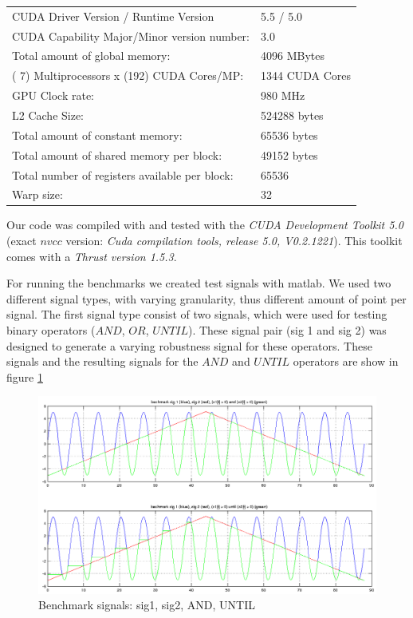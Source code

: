 \documentclass[a4paper,10pt]{article}
\begin{document}
\begin{center}
	\begin{tabular}{ll}
      CUDA Driver Version / Runtime Version          & 5.5 / 5.0 \\
      CUDA Capability Major/Minor version number:    & 3.0 \\
      Total amount of global memory:                 & 4096 MBytes \\
      ( 7) Multiprocessors x (192) CUDA Cores/MP:    & 1344 CUDA Cores \\
      GPU Clock rate:                                & 980 MHz \\
      L2 Cache Size:                                 & 524288 bytes\\
      Total amount of constant memory:               & 65536 bytes \\
      Total amount of shared memory per block:       & 49152 bytes \\
      Total number of registers available per block: & 65536 \\
      Warp size:                                     & 32 \\
	\end{tabular}
	\label{tab: GPU specifications}
\end{center}

Our code was compiled with and tested with the {\it CUDA Development Toolkit 5.0} (exact $nvcc$ version: {\it Cuda compilation tools, release 5.0, V0.2.1221}). This toolkit comes with a {\it Thrust version 1.5.3}.

For running the benchmarks we created test signals with matlab. We used two different signal types, with varying granularity, thus different amount of point per signal. 
The first signal type consist of two signals, which were used for testing binary operators ($AND$, $OR$, $UNTIL$). These signal pair (sig 1 and sig 2) was designed to generate a varying robustness signal for these operators.
These signals and the resulting signals for the $AND$ and $UNTIL$ operators are show in figure \ref{fig:sig1_sig2_and_until}

\begin{figure}[H]
    \includegraphics[scale=0.3]{bm_sig1_and_until.png}
    \caption{
        \label{fig:sig1_sig2_and_until}
        Benchmark signals: sig1, sig2, AND, UNTIL}
\end{figure} 
   
\end{document}
